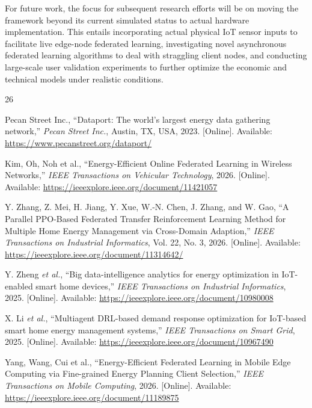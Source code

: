 \documentclass[journal]{IEEEtran}
\begin{document}
For future work, the focus for subsequent research efforts will be on moving the framework beyond its current simulated status to actual hardware implementation. This entails incorporating actual physical IoT sensor inputs to facilitate live edge-node federated learning, investigating novel asynchronous federated learning algorithms to deal with straggling client nodes, and conducting large-scale user validation experiments to further optimize the economic and technical models under realistic conditions.

\begin{thebibliography}{26}

Pecan Street Inc., ``Dataport: The world's largest energy data gathering network,'' \textit{Pecan Street Inc.}, Austin, TX, USA, 2023. [Online]. Available: \url{https://www.pecanstreet.org/dataport/}

Kim, Oh, Noh et al., ``Energy-Efficient Online Federated Learning in Wireless Networks,'' \textit{IEEE Transactions on Vehicular Technology}, 2026. [Online]. Available: \url{https://ieeexplore.ieee.org/document/11421057}

Y. Zhang, Z. Mei, H. Jiang, Y. Xue, W.-N. Chen, J. Zhang, and W. Gao, ``A Parallel PPO-Based Federated Transfer Reinforcement Learning Method for Multiple Home Energy Management via Cross-Domain Adaption,'' \textit{IEEE Transactions on Industrial Informatics}, Vol. 22, No. 3, 2026. [Online]. Available: \url{https://ieeexplore.ieee.org/document/11314642/}

Y. Zheng \textit{et al.}, ``Big data-intelligence analytics for energy optimization in IoT-enabled smart home devices,'' \textit{IEEE Transactions on Industrial Informatics}, 2025. [Online]. Available: \url{https://ieeexplore.ieee.org/document/10980008}

X. Li \textit{et al.}, ``Multiagent DRL-based demand response optimization for IoT-based smart home energy management systems,'' \textit{IEEE Transactions on Smart Grid}, 2025. [Online]. Available: \url{https://ieeexplore.ieee.org/document/10967490}

Yang, Wang, Cui et al., ``Energy-Efficient Federated Learning in Mobile Edge Computing via Fine-grained Energy Planning Client Selection,'' \textit{IEEE Transactions on Mobile Computing}, 2026. [Online]. Available: \url{https://ieeexplore.ieee.org/document/11189875}


\end{thebibliography}
\end{document}
